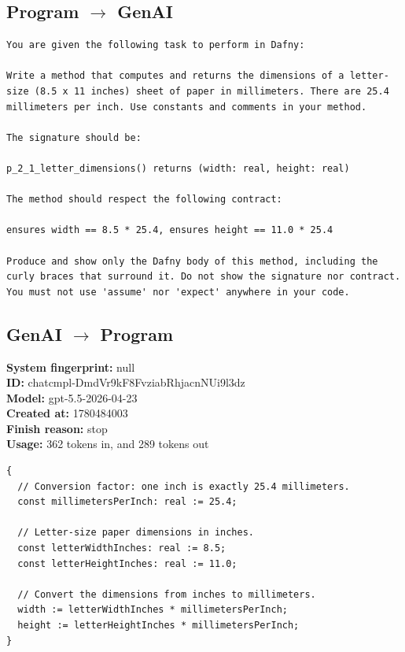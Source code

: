 \documentclass{article}
\begin{document}
\subsection*{Program $\rightarrow$ GenAI}
\begin{lstlisting}
You are given the following task to perform in Dafny:

Write a method that computes and returns the dimensions of a letter-size (8.5 x 11 inches) sheet of paper in millimeters. There are 25.4 millimeters per inch. Use constants and comments in your method.

The signature should be:

p_2_1_letter_dimensions() returns (width: real, height: real)

The method should respect the following contract:

ensures width == 8.5 * 25.4, ensures height == 11.0 * 25.4

Produce and show only the Dafny body of this method, including the curly braces that surround it. Do not show the signature nor contract. You must not use 'assume' nor 'expect' anywhere in your code.
\end{lstlisting}
\subsection*{GenAI $\rightarrow$ Program}
\textbf{System fingerprint: }null
\\\textbf{ID: }chatcmpl-DmdVr9kF8FvziabRhjacnNUi9l3dz
\\\textbf{Model: }gpt-5.5-2026-04-23
\\\textbf{Created at: }1780484003
\\\textbf{Finish reason: }stop
\\\textbf{Usage: }362 tokens in, and 289 tokens out
\begin{lstlisting}
{
  // Conversion factor: one inch is exactly 25.4 millimeters.
  const millimetersPerInch: real := 25.4;

  // Letter-size paper dimensions in inches.
  const letterWidthInches: real := 8.5;
  const letterHeightInches: real := 11.0;

  // Convert the dimensions from inches to millimeters.
  width := letterWidthInches * millimetersPerInch;
  height := letterHeightInches * millimetersPerInch;
}
\end{lstlisting}
\end{document}
